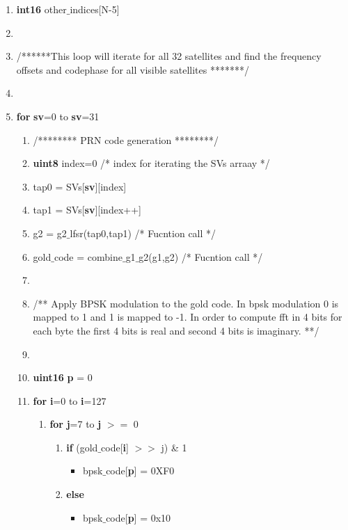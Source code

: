 \documentclass[journal,10pt,onecolumn]{article}
\begin{document}
\begin{itemize}
\begin{enumerate}
    \item[] \textbf{int16} other$\_$indices[N-5]
    \item[]
    \item[] /******This loop will iterate for all 32 satellites and find the frequency offsets and codephase for all visible satellites *******/
    \item[] 
    \item[] \textbf{for} \textbf{sv}=0 to \textbf{sv}=31
	\begin{enumerate}
        \item[] /******** PRN code generation ********/
        \item[] \textbf{uint8} index=0    \hspace{5mm} /* index for iterating the SVs arraay */ 
        \item[] tap0 = SVs[\textbf{sv}][index]
        \item[] tap1 = SVs[\textbf{sv}][index++]
        \item[] g2 = g2$\_$lfsr(tap0,tap1)   /* Fucntion call */
        \item[] gold$\_$code = combine$\_$g1$\_$g2(g1,g2)  /* Fucntion call */
        \item[]
        \item[]  /** Apply BPSK modulation to the gold code. In bpsk modulation 0 is mapped to 1 and 1 is mapped to -1. In order to compute fft in 4 bits for each byte the first 4 bits is real and second 4 bits is imaginary. **/
        \item[]
        \item[] \textbf{uint16} \textbf{p} = 0
        \item[] \textbf{for} \textbf{i}=0 to \textbf{i}=127
        \begin{enumerate}
            \item[] \textbf{for} \textbf{j}=7 to \textbf{j} $>=$ 0
            \begin{enumerate}
                \item[] \textbf{if} (gold$\_$code[\textbf{i}] $>>$ j) \& 1
                \begin{itemize}
                    \item[] bpsk$\_$code[\textbf{p}] = 0XF0
                \end{itemize}
                \item[] \textbf{else}
                \begin{itemize}
                    \item[] bpsk$\_$code[\textbf{p}] = 0x10

\end{itemize}
\end{enumerate}
\end{enumerate}
\end{enumerate}
\end{enumerate}
\end{itemize}
\end{document}
